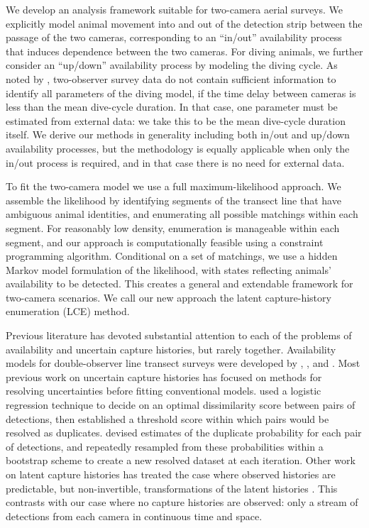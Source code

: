 \documentclass[useAMS, usenatbib, referee]{biom}\usepackage[]{graphicx}\usepackage[]{color}
\begin{document}
We develop an analysis framework suitable for two-camera aerial surveys. We explicitly model animal movement into and out of the detection strip between the passage of the two cameras, corresponding to an ``in/out'' availability process that induces dependence between the two cameras. For diving animals, we further consider an ``up/down'' availability process by modeling the diving cycle. As noted by \cite{Stevenson+al:19}, two-observer survey data do not contain sufficient information to identify all parameters of the diving model, if the time delay between cameras is less than the mean dive-cycle duration. In that case, one parameter must be estimated from external data: we take this to be the mean dive-cycle duration itself. We derive our methods in generality including both in/out and up/down availability processes, but the methodology is equally applicable when only the in/out process is required, and in that case there is no need for external data.

To fit the two-camera model we use a full maximum-likelihood approach. We assemble the likelihood by identifying segments of the transect line that have ambiguous animal identities, and enumerating all possible matchings within each segment. For reasonably low density, enumeration is manageable within each segment, and our approach is computationally feasible using a constraint programming algorithm. Conditional on a set of matchings, we use a hidden Markov model formulation of the likelihood, with states reflecting animals' availability to be detected. This creates a general and extendable framework for two-camera scenarios. We call our new approach the latent capture-history enumeration (LCE) method.


Previous literature has devoted substantial attention to each of the problems of availability and uncertain capture histories, but rarely together. Availability models for double-observer line transect surveys were developed by \cite{Borchers+al:13}, \cite{Langrock+al:13}, and \cite{Borchers+Langrock:15}. Most previous work on uncertain capture histories has focused on methods for resolving uncertainties before fitting conventional models. \cite{Pike+DoniolValcroze:15} used a logistic regression technique to decide on an optimal dissimilarity score between pairs of detections, then established a threshold score within which pairs would be resolved as duplicates. \cite{Hamilton+al:18} devised estimates of the duplicate probability for each pair of detections, and repeatedly resampled from these probabilities within a bootstrap scheme to create a new resolved dataset at each iteration. Other work on latent capture histories has treated the case where observed histories are predictable, but non-invertible, transformations of the latent histories \citep[e.g.][]{Zhang+al:19,Bonner+Holmberg:13,Link+al:10}. This contrasts with our case where no capture histories are observed: only a stream of detections from each camera in continuous time and space.
\end{document}
